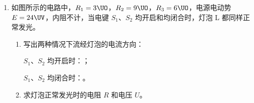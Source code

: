 \documentclass[\gkver]{gaokaozhenti}
\begin{document}
\begin{enumerate}
{（2）由折射定律
$\frac{\sin i}{\sin r} = n$ ①

得 $\sin r = \frac{\sin i}{n} = \frac{\frac{\sqrt{2}}{2}}{\sqrt{2}} = \frac{1}{2}$，$r = 30^{\circ}$
由几何关系及对称性，有

$\frac{\alpha}{2} = r - (i - r) = 2r - i$ ②

$\alpha = 4r - 2i$ ②$'$

以 $r = 30^{\circ}$，$i = 45^{\circ}$ 代入得：$\alpha = 30^{\circ}$

（3）红光 $\alpha$ 最大，紫光 $\alpha$ 最小。

\textbf{评分标准}：（1）3 分：路径 2 分。方向 1 分。（只要反射点在两虚线之间的圆上，路径即算对；只要有一只箭头。方向即算对）

（2）5 分：由折射定律（①式）得 $r = 30^{\circ}$ 得 2 分；由几何关系（②式或②$'$式）得出 $\alpha = 30^{\circ}$ 得 3 分。

（3）2 分：每个结论各 1 分。
}

\item
如图所示的电路中，$R_{1} = 3\UO$，$R_{2} = 9\UO$，$R_{3} = 6\UO$，电源电动势 $E = 24\UV$，内阻不计，当电键 $S_{1}$、$S_{2}$ 均开启和均闭合时，灯泡 L 都同样正常发光。
\begin{enumerate}
	\item
	写出两种情况下流经灯泡的电流方向：

	$S_{1}$、$S_{2}$ 均开启时：；

	$S_{1}$、$S_{2}$ 均闭合时：。
	\item
	求灯泡正常发光时的电阻 $R$ 和电压 $U$。
\end{enumerate}
\onepicture[align=right, w=5cm]{}

\end{enumerate}
\end{document}
